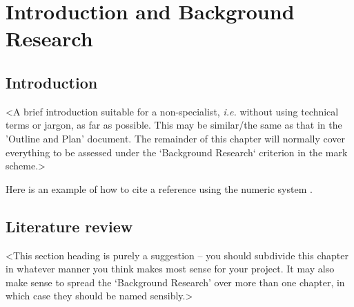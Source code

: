 \chapter{Introduction and Background Research}

\label{chapter1}

\section{Introduction}

<A brief introduction suitable for a non-specialist, {\em i.e.} without using technical terms or jargon, as far as possible. This may be similar/the same as that in the 'Outline and Plan' document. The remainder of this chapter will normally cover everything to be assessed under the `Background Research` criterion in the mark scheme.>

Here is an example of how to cite a reference using the numeric system \cite{parikh1980adaptive}.


\section{Literature review}
<This section heading is purely a suggestion -- you should subdivide this chapter in whatever manner you think makes most sense for your project. It may also make sense to spread the `Background Research' over more than one chapter, in which case they should be named sensibly.>

